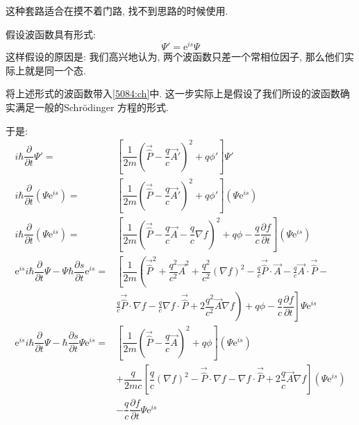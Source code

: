 \documentclass[a4paper, 11pt]{article}
\begin{document}
\begin{spacing}{1.2}
        这种套路适合在摸不着门路, 找不到思路的时候使用. 
        
        假设波函数具有形式:
        \begin{equation}
          \Psi' = \mathrm{e}^{is}\Psi
        \end{equation}
        这样假设的原因是: 我们高兴地认为, 两个波函数只差一个常相位因子, 那么他们实际上就是同一个态.

        将上述形式的波函数带入\eqref{5084:ch}中. 这一步实际上是假设了我们所设的波函数确实满足一般的Schr\"odinger
        方程的形式. 

        于是:
        \begin{equation*}
          \begin{aligned}
            i\hbar\dfrac{\partial}{\partial{}t}\Psi'
            =&\left[\dfrac{1}{2m}\left(\vec{\hat{P}}-\dfrac{q}{c}\vec{A}'\right)^2+q\phi'\right]\Psi'\\
            i\hbar\dfrac{\partial}{\partial{}t}\left(\Psi\mathrm{e}^{is}\right)
              =&\left[\dfrac{1}{2m}\left(\vec{\hat{P}}-\dfrac{q}{c}\vec{A}'\right)^2+q\phi'\right]\left(\Psi\mathrm{e}^{is}\right)\\
            i\hbar\dfrac{\partial}{\partial{}t}\left(\Psi\mathrm{e}^{is}\right)
              =&\left[\dfrac{1}{2m}\left(\vec{\hat{P}}-\dfrac{q}{c}\vec{A}-\dfrac{q}{c}\nabla{}f\right)^2+q\phi-\dfrac{q}{c}\dfrac{\partial{}f}{\partial{}t}\right]\left(\Psi\mathrm{e}^{is}\right)\\
            \mathrm{e}^{is}i\hbar\dfrac{\partial}{\partial{}t}\Psi-\Psi\hbar\dfrac{\partial{}s}{\partial{}t}\mathrm{e}^{is} 
              =&\left[\dfrac{1}{2m}\left(\vec{\hat{P}}^2+\dfrac{q^2}{c^2}\vec{A}^2+\dfrac{q^2}{c^2}(\nabla{}f)^2-\frac{q}{c}\vec{\hat{P}}\cdot\vec{A}-\frac{q}{c}\vec{A}\cdot\vec{\hat{P}}-\right.\right.\\
               &\left.\left.\frac{q}{c}\vec{\hat{P}}\cdot\nabla{}f-\frac{q}{c}\nabla{}f\cdot\vec{\hat{P}}+2\dfrac{q^2}{c^2}\vec{A}\nabla{}f\right)+q\phi-\dfrac{q}{c}\dfrac{\partial{}f}{\partial{}t}\right]\Psi\mathrm{e}^{is}\\
            \mathrm{e}^{is}i\hbar\dfrac{\partial}{\partial{}t}\Psi-\hbar\dfrac{\partial{}s}{\partial{}t}\Psi\mathrm{e}^{is} 
              =&\left[\dfrac{1}{2m}\left(\vec{\hat{P}}-\dfrac{q}{c}\vec{A}\right)^2+q\phi\right]\left(\Psi\mathrm{e}^{is}\right)\\
               &+\dfrac{q}{2mc}\left[\dfrac{q}{c}(\nabla{}f)^2-\vec{\hat{P}}\cdot\nabla{}f-\nabla{}f\cdot\vec{\hat{P}}+2\dfrac{q}{c}\vec{A}\nabla{}f\right]\left(\Psi\mathrm{e}^{is}\right)\\
               &-\dfrac{q}{c}\dfrac{\partial{}f}{\partial{}t}\Psi\mathrm{e}^{is}
          \end{aligned}
        \end{equation*}


\end{spacing}
\end{document}
